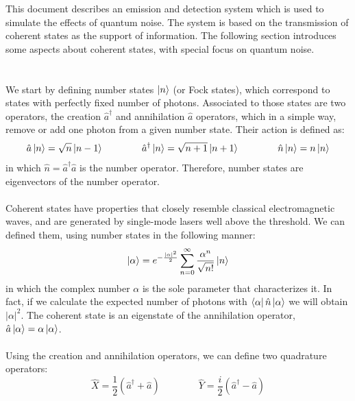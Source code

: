 This document describes an emission and detection system which is used to simulate the effects of quantum noise. The system is based on the transmission of coherent states as the support of information. The following section introduces some aspects about coherent states, with special focus on quantum noise.\\
\\
\\
We start by defining number states $\ket{n}$ (or Fock states), which correspond to states with perfectly fixed number of photons.
\cite{loudon2000}
Associated to those states are two operators, the creation $\hat{a}^\dagger$ and annihilation $\hat{a}$ operators, which in a simple way, remove or add one photon from a given number state.
\cite{fox2006}
Their action is defined as:
\begin{equation}
\hat{a} \ket{n} = \sqrt{n} \ket{n-1}
\qquad \qquad
\hat{a}^\dagger \ket{n} = \sqrt{n+1} \ket{n+1}
\qquad \qquad
\hat{n} \ket{n} = n \ket{n}
\end{equation}
in which $\hat{n} = \hat{a}^\dagger\hat{a}$ is the number operator. Therefore, number states are eigenvectors of the number operator.\\
\\
Coherent states have properties that closely resemble classical electromagnetic waves, and are generated by single-mode lasers well above the threshold.
\cite{loudon2000}
We can defined them, using number states in the following manner:
\begin{equation}
\ket{\alpha} = e^{-\frac{|\alpha|^2}{2}} \sum_{n=0}^\infty \frac{\alpha^n}{\sqrt{n!}} \ket{n}
\end{equation}
in which the complex number $\alpha$ is the sole parameter that characterizes it.
In fact, if we calculate the expected number of photons with $\bra{\alpha} \hat{n} \ket{\alpha}$ we will obtain $|\alpha|^2$. The coherent state is an eigenstate of the annihilation operator, $\hat{a}\ket{\alpha} = \alpha \ket{\alpha}$.\\
\\
%
%
Using the creation and annihilation operators, we can define two quadrature operators:
\cite{loudon2000}
%
\begin{equation}
\hat{X} = \frac{1}{2} \left( \hat{a}^\dagger + \hat{a} \right)
\qquad
\qquad
\hat{Y} = \frac{i}{2} \left( \hat{a}^\dagger - \hat{a} \right)
\end{equation}
